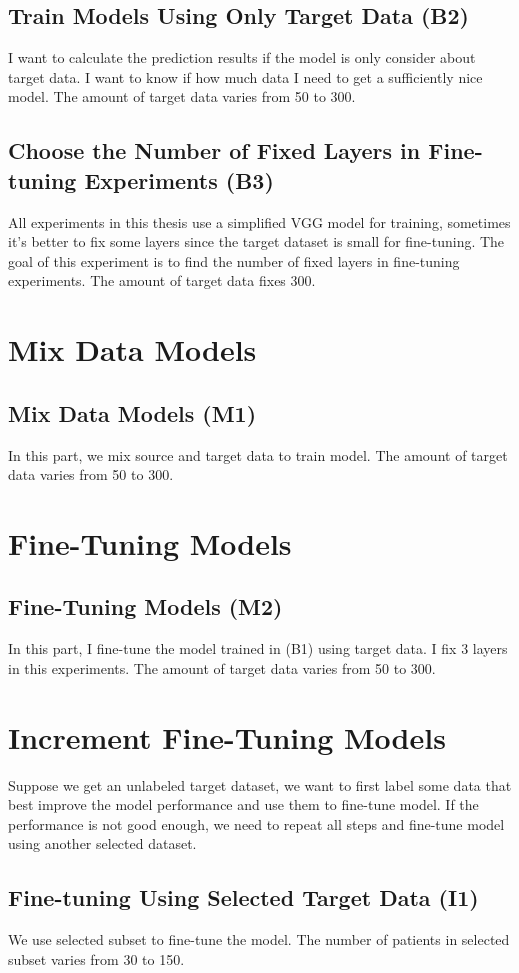 \subsection{Train Models Using Only Target Data (B2)}
I want to calculate the prediction results if the model is only consider about target data. I want to know if how much data I need to get a sufficiently nice model. The amount of target data varies from 50 to 300.
\subsection{Choose the Number of Fixed Layers in Fine-tuning Experiments (B3)}
All experiments in this thesis use a simplified VGG model for training,  sometimes it's better to fix some layers since the target dataset is small for fine-tuning. The goal of this experiment is to find the number of fixed layers in fine-tuning experiments. The amount of target data fixes 300.
~\\
\section{Mix Data Models}
\subsection{Mix Data Models (M1)}
In this part, we mix source and target data to train model. The amount of target data varies from 50 to 300.
~\\
\section{Fine-Tuning Models}
\subsection{Fine-Tuning Models (M2)}
In this part, I fine-tune the model trained in (B1) using target data. I fix 3 layers in this experiments. The amount of target data varies from 50 to 300.
~\\
\section{Increment Fine-Tuning Models}
Suppose we get an unlabeled target dataset, we want to first label some data that best improve the model performance and use them to fine-tune model. If the performance is not good enough, we need to repeat all steps and fine-tune model using another selected dataset.
\subsection{Fine-tuning Using Selected Target Data (I1)}
We use selected subset to fine-tune the model. The number of patients in selected subset varies from 30 to 150.

